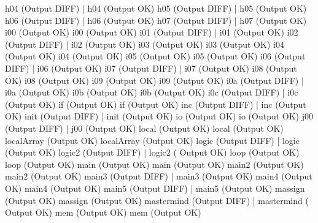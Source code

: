 \documentclass[12pt]{book}
\begin{document}
h04 (Output DIFF)                                      |    h04 (Output OK)
h05 (Output DIFF)                                      |    h05 (Output OK)
h06 (Output DIFF)                                      |    h06 (Output OK)
h07 (Output DIFF)                                      |    h07 (Output OK)
i00 (Output OK)                                        i00 (Output OK)
i01 (Output DIFF)                                      |    i01 (Output OK)
i02 (Output DIFF)                                      |    i02 (Output OK)
i03 (Output OK)                                        i03 (Output OK)
i04 (Output OK)                                        i04 (Output OK)
i05 (Output OK)                                        i05 (Output OK)
i06 (Output DIFF)                                      |    i06 (Output OK)
i07 (Output DIFF)                                      |    i07 (Output OK)
i08 (Output OK)                                        i08 (Output OK)
i09 (Output OK)                                        i09 (Output OK)
i0a (Output DIFF)                                      |    i0a (Output OK)
i0b (Output OK)                                        i0b (Output OK)
i0c (Output DIFF)                                      |    i0c (Output OK)
if (Output OK)                                        if (Output OK)
inc (Output DIFF)                                      |    inc (Output OK)
init (Output DIFF)                                      |    init (Output OK)
io (Output OK)                                        io (Output OK)
j00 (Output DIFF)                                      |    j00 (Output OK)
local (Output OK)                                    local (Output OK)
localArray (Output OK)                                    localArray (Output
OK)
logic (Output DIFF)                                      |    logic (Output 
OK)
logic2 (Output DIFF)                                      |    logic2 (
Output OK)
loop (Output OK)                                    loop (Output OK)
main (Output OK)                                    main (Output OK)
main2 (Output OK)                                    main2 (Output OK)
main3 (Output DIFF)                                      |    main3 (Output 
OK)
main4 (Output OK)                                    main4 (Output OK)
main5 (Output DIFF)                                      |    main5 (Output 
OK)
massign (Output OK)                                    massign (Output OK)
mastermind (Output DIFF)                                  |    mastermind (
Output OK)
mem (Output OK)                                        mem (Output OK)
\end{document}
